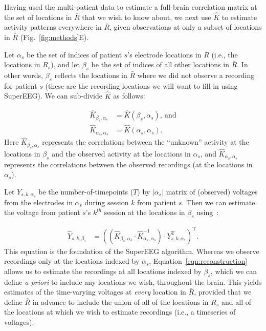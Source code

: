 \documentclass[11pt]{article}
\begin{document}
Having used the multi-patient data to estimate a full-brain
correlation matrix at the set of locations in $\bar{R}$ that we wish
to know about, we next use $\hat{K}$ to estimate activity patterns
everywhere in $\bar{R}$, given observations at only a subset of
locations in $\bar{R}$ (Fig.~\ref{fig:methods}E).

Let $\alpha_s$ be the set of indices of patient $s$'s electrode locations in
$\bar{R}$ (i.e., the locations in $R_s$), and let $\beta_s$ be the set of indices of all other
locations in $\bar{R}$. In other words, $\beta_s$ reflects the locations
in $\bar{R}$ where we did not observe a recording for patient $s$
(these are the recording locations we will want to fill in using SuperEEG).
We can sub-divide $\hat{K}$ as follows:

\begin{align}
\hat{K}_{\beta_s,\alpha_s} &= \hat{K}(\beta_s,\alpha_s),~\mathrm{and}\label{eqn:Kba}\\
\hat{K}_{\alpha_s,\alpha_s} &= \hat{K}(\alpha_s,\alpha_s)\label{eqn:Kaa}.
\end{align}
Here $\hat{K}_{\beta_s, \alpha_s}$ represents the correlations between
the ``unknown'' activity at the locations in $\beta_s$ and the
observed activity at the locations in $\alpha_s$, and
$\hat{K}_{\alpha_s, \alpha_s}$ represents the correlations between the
observed recordings (at the locations in $\alpha_s$).

Let $Y_{s,k,\alpha_s}$ be the number-of-timepoints ($T$) by
$\left|\alpha_s\right|$ matrix of (observed) voltages from the electrodes in
$\alpha_s$ during session $k$ from patient $s$. Then we can estimate the
voltage from patient $s$'s $k^{th}$ session at the locations in
$\beta_s$ using~\cite{Rasm06}:

\begin{align}
\hat{Y}_{s,k,\beta_s} &= ((\hat{K}_{\beta_s,\alpha_s}\cdot\hat{K}_{\alpha_s,\alpha_s}^{-1})\cdot Y_{s,k,\alpha_s}^\mathrm{T})^\mathrm{T}.\label{eqn:reconstruction}
\end{align}
This equation is the foundation of the SuperEEG algorithm.  Whereas we
observe recordings only at the locations indexed by $\alpha_s$,
Equation~\ref{eqn:reconstruction} allows us to estimate the recordings
at all locations indexed by $\beta_s$, which we can define \textit{a priori}
to include any locations we wish, throughout the brain.  This yields
estimates of the time-varying voltages at \textit{every} location in
$\bar{R}$, provided that we define $\bar{R}$ in advance to include the
union of all of the locations in $R_s$ and all of the locations
at which we wish to estimate recordings (i.e., a timeseries of
voltages).
\end{document}
